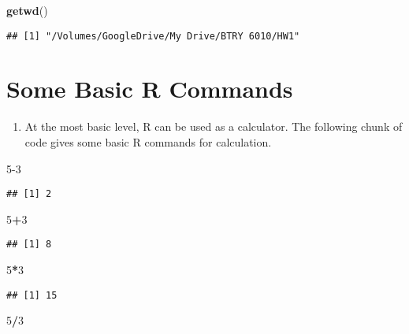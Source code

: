 \documentclass[]{article}
\newenvironment{Shaded}{\begin{snugshade}}{\end{snugshade}}
\newcommand{\DecValTok}[1]{\textcolor[rgb]{0.00,0.00,0.81}{#1}}
\newcommand{\KeywordTok}[1]{\textcolor[rgb]{0.13,0.29,0.53}{\textbf{#1}}}
\newcommand{\NormalTok}[1]{#1}
\newcommand{\OperatorTok}[1]{\textcolor[rgb]{0.81,0.36,0.00}{\textbf{#1}}}
\providecommand{\tightlist}{%
  \setlength{\itemsep}{0pt}\setlength{\parskip}{0pt}}
\begin{document}
\begin{Shaded}
\begin{Highlighting}[]
\KeywordTok{getwd}\NormalTok{()}
\end{Highlighting}
\end{Shaded}

\begin{verbatim}
## [1] "/Volumes/GoogleDrive/My Drive/BTRY 6010/HW1"
\end{verbatim}

\hypertarget{some-basic-r-commands}{%
\section{Some Basic R Commands}\label{some-basic-r-commands}}

\begin{enumerate}
\def\labelenumi{\arabic{enumi}.}
\tightlist
\item
  At the most basic level, R can be used as a calculator. The following
  chunk of code gives some basic R commands for calculation.
\end{enumerate}

\begin{Shaded}
\begin{Highlighting}[]
\DecValTok{5-3}
\end{Highlighting}
\end{Shaded}

\begin{verbatim}
## [1] 2
\end{verbatim}

\begin{Shaded}
\begin{Highlighting}[]
\DecValTok{5}\OperatorTok{+}\DecValTok{3}
\end{Highlighting}
\end{Shaded}

\begin{verbatim}
## [1] 8
\end{verbatim}

\begin{Shaded}
\begin{Highlighting}[]
\DecValTok{5}\OperatorTok{*}\DecValTok{3}
\end{Highlighting}
\end{Shaded}

\begin{verbatim}
## [1] 15
\end{verbatim}

\begin{Shaded}
\begin{Highlighting}[]
\DecValTok{5}\OperatorTok{/}\DecValTok{3}
\end{Highlighting}
\end{Shaded}
\end{document}
